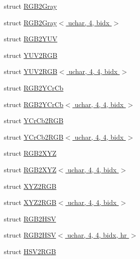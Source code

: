 \begin{DoxyCompactItemize}
\item 
struct \hyperlink{structcv_1_1gpu_1_1device_1_1color__detail_1_1RGB2Gray}{R\-G\-B2\-Gray}
\item 
struct \hyperlink{structcv_1_1gpu_1_1device_1_1color__detail_1_1RGB2Gray_3_01uchar_00_014_00_01bidx_01_4}{R\-G\-B2\-Gray$<$ uchar, 4, bidx $>$}
\item 
struct \hyperlink{structcv_1_1gpu_1_1device_1_1color__detail_1_1RGB2YUV}{R\-G\-B2\-Y\-U\-V}
\item 
struct \hyperlink{structcv_1_1gpu_1_1device_1_1color__detail_1_1YUV2RGB}{Y\-U\-V2\-R\-G\-B}
\item 
struct \hyperlink{structcv_1_1gpu_1_1device_1_1color__detail_1_1YUV2RGB_3_01uchar_00_014_00_014_00_01bidx_01_4}{Y\-U\-V2\-R\-G\-B$<$ uchar, 4, 4, bidx $>$}
\item 
struct \hyperlink{structcv_1_1gpu_1_1device_1_1color__detail_1_1RGB2YCrCb}{R\-G\-B2\-Y\-Cr\-Cb}
\item 
struct \hyperlink{structcv_1_1gpu_1_1device_1_1color__detail_1_1RGB2YCrCb_3_01uchar_00_014_00_014_00_01bidx_01_4}{R\-G\-B2\-Y\-Cr\-Cb$<$ uchar, 4, 4, bidx $>$}
\item 
struct \hyperlink{structcv_1_1gpu_1_1device_1_1color__detail_1_1YCrCb2RGB}{Y\-Cr\-Cb2\-R\-G\-B}
\item 
struct \hyperlink{structcv_1_1gpu_1_1device_1_1color__detail_1_1YCrCb2RGB_3_01uchar_00_014_00_014_00_01bidx_01_4}{Y\-Cr\-Cb2\-R\-G\-B$<$ uchar, 4, 4, bidx $>$}
\item 
struct \hyperlink{structcv_1_1gpu_1_1device_1_1color__detail_1_1RGB2XYZ}{R\-G\-B2\-X\-Y\-Z}
\item 
struct \hyperlink{structcv_1_1gpu_1_1device_1_1color__detail_1_1RGB2XYZ_3_01uchar_00_014_00_014_00_01bidx_01_4}{R\-G\-B2\-X\-Y\-Z$<$ uchar, 4, 4, bidx $>$}
\item 
struct \hyperlink{structcv_1_1gpu_1_1device_1_1color__detail_1_1XYZ2RGB}{X\-Y\-Z2\-R\-G\-B}
\item 
struct \hyperlink{structcv_1_1gpu_1_1device_1_1color__detail_1_1XYZ2RGB_3_01uchar_00_014_00_014_00_01bidx_01_4}{X\-Y\-Z2\-R\-G\-B$<$ uchar, 4, 4, bidx $>$}
\item 
struct \hyperlink{structcv_1_1gpu_1_1device_1_1color__detail_1_1RGB2HSV}{R\-G\-B2\-H\-S\-V}
\item 
struct \hyperlink{structcv_1_1gpu_1_1device_1_1color__detail_1_1RGB2HSV_3_01uchar_00_014_00_014_00_01bidx_00_01hr_01_4}{R\-G\-B2\-H\-S\-V$<$ uchar, 4, 4, bidx, hr $>$}
\item 
struct \hyperlink{structcv_1_1gpu_1_1device_1_1color__detail_1_1HSV2RGB}{H\-S\-V2\-R\-G\-B}

\end{DoxyCompactItemize}
